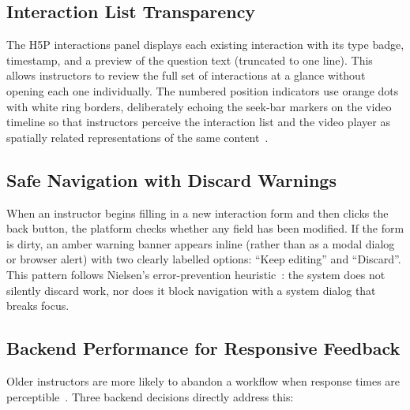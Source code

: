 \subsection{Interaction List Transparency}

The H5P interactions panel displays each existing interaction with its type
badge, timestamp, and a preview of the question text (truncated to one line).
This allows instructors to review the full set of interactions at a glance
without opening each one individually. The numbered position indicators use
orange dots with white ring borders, deliberately echoing the seek-bar markers
on the video timeline so that instructors perceive the interaction list and the
video player as spatially related representations of the same
content~\cite{chandler1991}.

\subsection{Safe Navigation with Discard Warnings}

When an instructor begins filling in a new interaction form and then clicks the
back button, the platform checks whether any field has been modified. If the
form is dirty, an amber warning banner appears inline (rather than as a modal
dialog or browser alert) with two clearly labelled options: ``Keep editing''
and ``Discard''. This pattern follows Nielsen's error-prevention
heuristic~\cite{nielsen1994}: the system does not silently discard work, nor
does it block navigation with a system dialog that breaks focus.

\subsection{Backend Performance for Responsive Feedback}

Older instructors are more likely to abandon a workflow when response times are
perceptible~\cite{nielsen1994}. Three backend decisions directly address this:

